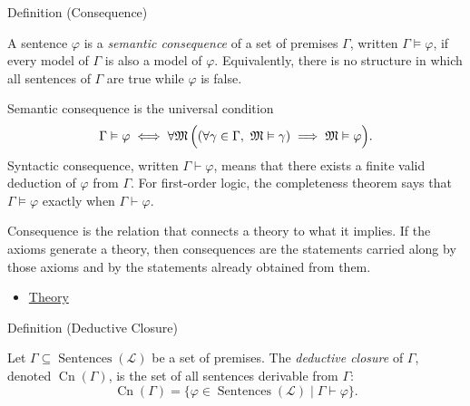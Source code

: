 \begin{definitionbox}{Definition (Consequence)}
\begin{definition}[Consequence]
\label{def:axiom-systems-consequence}
A sentence $\varphi$ is a \emph{semantic consequence} of a set of premises
$\Gamma$, written $\Gamma\vDash\varphi$, if every model of $\Gamma$ is also a
model of $\varphi$. Equivalently, there is no structure in which all sentences
of $\Gamma$ are true while $\varphi$ is false.
\end{definition}
\end{definitionbox}
\begin{remark*}
Semantic consequence is the universal condition
\[
  \Gamma\vDash\varphi
  \iff
  \forall\mathfrak{M}\,
  \Bigl(
    (\forall\gamma\in\Gamma,\ \mathfrak{M}\vDash\gamma)
    \implies
    \mathfrak{M}\vDash\varphi
  \Bigr).
\]
Syntactic consequence, written $\Gamma\vdash\varphi$, means that there exists
a finite valid deduction of $\varphi$ from $\Gamma$. For first-order logic,
the completeness theorem says that $\Gamma\vDash\varphi$ exactly when
$\Gamma\vdash\varphi$.
\end{remark*}




\begin{remark*}[Interpretation]
Consequence is the relation that connects a theory to what it implies. If the
axioms generate a theory, then consequences are the statements carried along
by those axioms and by the statements already obtained from them.
\end{remark*}

\begin{dependencies}
\begin{itemize}
  \item \hyperref[def:axiom-systems-theory]{Theory}
\end{itemize}
\end{dependencies}

\begin{definitionbox}{Definition (Deductive Closure)}
\begin{definition}
\label{def:deductive-closure}
Let $\Gamma\subseteq\operatorname{Sentences}(\mathcal{L})$ be a set of
premises. The \emph{deductive closure} of $\Gamma$, denoted
$\operatorname{Cn}(\Gamma)$, is the set of all sentences derivable from
$\Gamma$:
\[
  \operatorname{Cn}(\Gamma)
  =
  \{\varphi\in\operatorname{Sentences}(\mathcal{L})\mid
    \Gamma\vdash\varphi\}.
\]
\end{definition}
\end{definitionbox}

